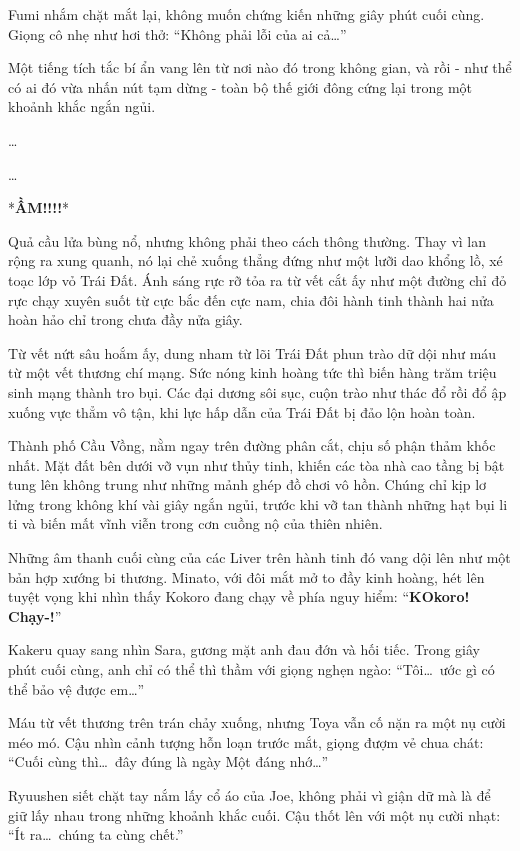 \documentclass[../main.tex]{subfiles}
\begin{document}
Fumi nhắm chặt mắt lại, không muốn chứng kiến những giây phút cuối cùng. Giọng cô nhẹ như hơi thở: ``Không phải lỗi của ai cả\dots''

Một tiếng tích tắc bí ẩn vang lên từ nơi nào đó trong không gian, và rồi - như thể có ai đó vừa nhấn nút tạm dừng - toàn bộ thế giới đông cứng lại trong một khoảnh khắc ngắn ngủi.

\dots

\dots

*\textbf{\Large ẦM!!!!}*


Quả cầu lửa bùng nổ, nhưng không phải theo cách thông thường. Thay vì lan rộng ra xung quanh, nó lại chẻ xuống thẳng đứng như một lưỡi dao khổng lồ, xé toạc lớp vỏ Trái Đất. Ánh sáng rực rỡ tỏa ra từ vết cắt ấy như một đường chỉ đỏ rực chạy xuyên suốt từ cực bắc đến cực nam, chia đôi hành tinh thành hai nửa hoàn hảo chỉ trong chưa đầy nửa giây.

Từ vết nứt sâu hoắm ấy, dung nham từ lõi Trái Đất phun trào dữ dội như máu từ một vết thương chí mạng. Sức nóng kinh hoàng tức thì biến hàng trăm triệu sinh mạng thành tro bụi. Các đại dương sôi sục, cuộn trào như thác đổ rồi đổ ập xuống vực thẳm vô tận, khi lực hấp dẫn của Trái Đất bị đảo lộn hoàn toàn.

Thành phố Cầu Vồng, nằm ngay trên đường phân cắt, chịu số phận thảm khốc nhất. Mặt đất bên dưới vỡ vụn như thủy tinh, khiến các tòa nhà cao tầng bị bật tung lên không trung như những mảnh ghép đồ chơi vô hồn. Chúng chỉ kịp lơ lửng trong không khí vài giây ngắn ngủi, trước khi vỡ tan thành những hạt bụi li ti và biến mất vĩnh viễn trong cơn cuồng nộ của thiên nhiên.

Những âm thanh cuối cùng của các Liver trên hành tinh đó vang dội lên như một bản hợp xướng bi thương. Minato, với đôi mắt mở to đầy kinh hoàng, hét lên tuyệt vọng khi nhìn thấy Kokoro đang chạy về phía nguy hiểm: ``\textbf{KOkoro! Chạy-!}''

Kakeru quay sang nhìn Sara, gương mặt anh đau đớn và hối tiếc. Trong giây phút cuối cùng, anh chỉ có thể thì thầm với giọng nghẹn ngào: ``Tôi\dots\ ước gì có thể bảo vệ được em\dots''

Máu từ vết thương trên trán chảy xuống, nhưng Toya vẫn cố nặn ra một nụ cười méo mó. Cậu nhìn cảnh tượng hỗn loạn trước mắt, giọng đượm vẻ chua chát: ``Cuối cùng thì\dots\ đây đúng là ngày Một đáng nhớ\dots''

Ryuushen siết chặt tay nắm lấy cổ áo của Joe, không phải vì giận dữ mà là để giữ lấy nhau trong những khoảnh khắc cuối. Cậu thốt lên với một nụ cười nhạt: ``Ít ra\dots\ chúng ta cùng chết.''
\end{document}
